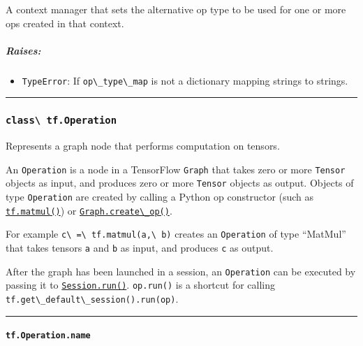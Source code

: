 A context manager that sets the alternative op type to be used for one
or more ops created in that context.

\subparagraph{Raises: }\label{raises-5}

\begin{itemize}
\tightlist
\item
  \lstinline{TypeError}: If \lstinline{op\_type\_map} is not a dictionary
  mapping strings to strings.
\end{itemize}

\begin{center}\rule{0.5\linewidth}{\linethickness}\end{center}

\subsubsection{\texorpdfstring{\lstinline{class\ tf.Operation}
}{class tf.Operation }}\label{class-tf.operation}

Represents a graph node that performs computation on tensors.

An \lstinline{Operation} is a node in a TensorFlow \lstinline{Graph} that
takes zero or more \lstinline{Tensor} objects as input, and produces zero
or more \lstinline{Tensor} objects as output. Objects of type
\lstinline{Operation} are created by calling a Python op constructor (such
as
\href{../../api_docs/python/math_ops.md\#matmul}{\lstinline{tf.matmul()}})
or
\href{../../api_docs/python/framework.md\#Graph.create_op}{\lstinline{Graph.create\_op()}}.

For example \lstinline{c\ =\ tf.matmul(a,\ b)} creates an
\lstinline{Operation} of type ``MatMul'' that takes tensors \lstinline{a} and
\lstinline{b} as input, and produces \lstinline{c} as output.

After the graph has been launched in a session, an \lstinline{Operation}
can be executed by passing it to
\href{../../api_docs/python/client.md\#Session.run}{\lstinline{Session.run()}}.
\lstinline{op.run()} is a shortcut for calling
\lstinline{tf.get\_default\_session().run(op)}.

\begin{center}\rule{0.5\linewidth}{\linethickness}\end{center}

\paragraph{\texorpdfstring{\lstinline{tf.Operation.name}
}{tf.Operation.name }}\label{tf.operation.name}

